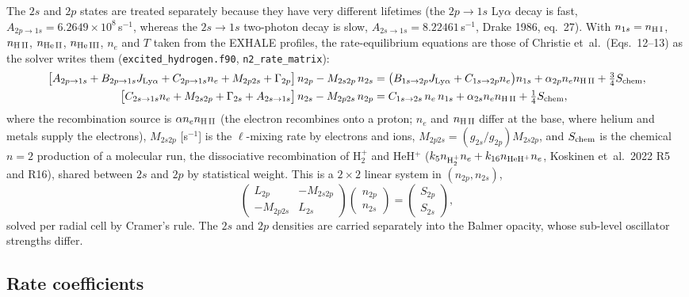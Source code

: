 \documentclass[english,a4paper]{my_memo}
\begin{document}
The $2s$ and $2p$ states are treated separately because they have very
different lifetimes (the $2p\to1s$ Ly$\alpha$ decay is fast,
$A_{2p\to1s}=6.2649\times10^{8}\,$s$^{-1}$, whereas the $2s\to1s$ two-photon
decay is slow, $A_{2s\to1s}=8.22461\,$s$^{-1}$, Drake 1986, eq.~27). With
$n_{1s}=n_{\rm H\,I}$, $n_{\rm H\,II}$, $n_{\rm He\,II}$, $n_{\rm He\,III}$,
$n_e$ and $T$ taken from the EXHALE profiles, the rate-equilibrium
equations are those of Christie et~al.\ (Eqs.~12--13) as the solver
writes them (\texttt{excited\_hydrogen.f90}, \texttt{n2\_rate\_matrix}):
\begin{align}
\bigl[A_{2p\to1s} + B_{2p\to1s}J_{\rm Ly\alpha}
   + C_{2p\to1s}n_e + M_{2p2s} + \Gamma_{2p}\bigr]\,n_{2p}
   - M_{2s2p}\,n_{2s}
   &= \bigl(B_{1s\to2p}J_{\rm Ly\alpha}+C_{1s\to2p}n_e\bigr)n_{1s}
      + \alpha_{2p}n_e n_{\rm H\,II} + \tfrac34 S_{\rm chem}, \\
\bigl[C_{2s\to1s}n_e + M_{2s2p} + \Gamma_{2s} + A_{2s\to1s}\bigr]\,n_{2s}
   - M_{2p2s}\,n_{2p}
   &= C_{1s\to2s}\,n_e\,n_{1s} + \alpha_{2s}n_e n_{\rm H\,II}
      + \tfrac14 S_{\rm chem},
\end{align}
where the recombination source is $\alpha n_e n_{\rm H\,II}$ (the
electron recombines onto a proton; $n_e$ and $n_{\rm H\,II}$ differ at the
base, where helium and metals supply the electrons), $M_{2s2p}$ [s$^{-1}$]
is the $\ell$-mixing rate by electrons and ions, $M_{2p2s} =
(g_{2s}/g_{2p})M_{2s2p}$, and $S_{\rm chem}$ is the chemical $n=2$
production of a molecular run, the dissociative recombination of H$_2^+$
and HeH$^+$ ($k_5 n_{\rm H_2^+}n_e + k_{16}n_{\rm HeH^+}n_e$, Koskinen
et~al.\ 2022 R5 and R16), shared between $2s$ and $2p$ by statistical
weight. This is a $2\times2$ linear system in $(n_{2p},n_{2s})$,
\[
\begin{pmatrix} L_{2p} & -M_{2s2p} \\ -M_{2p2s} & L_{2s}\end{pmatrix}
\begin{pmatrix} n_{2p}\\ n_{2s}\end{pmatrix}
=\begin{pmatrix} S_{2p}\\ S_{2s}\end{pmatrix},
\]
solved per radial cell by Cramer's rule. The $2s$ and $2p$ densities are
carried separately into the Balmer opacity, whose sub-level oscillator
strengths differ.

\subsection{Rate coefficients}
\end{document}
